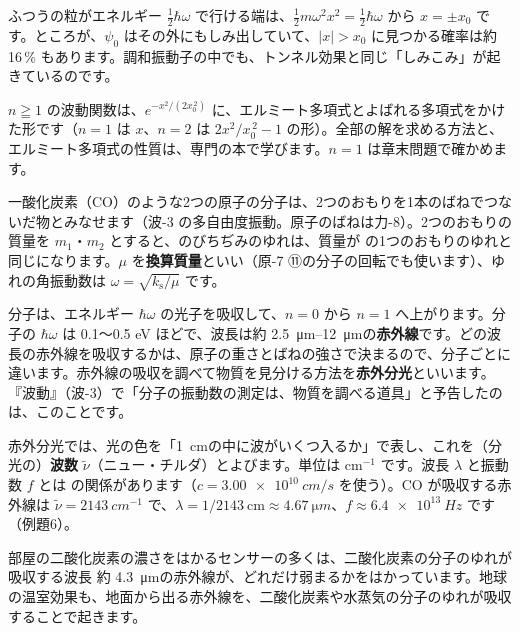\noindent ふつうの粒がエネルギー $\tfrac12\hbar\omega$ で行ける端は、$\tfrac12m\omega^2x^2=\tfrac12\hbar\omega$ から $x=\pm x_0$ です。ところが、$\psi_0$ はその外にもしみ出していて、$|x|>x_0$ に見つかる確率は約16\,\% もあります。調和振動子の中でも、トンネル効果と同じ「しみこみ」が起きているのです。

\begin{seikaku}
$n\geqq1$ の波動関数は、$e^{-x^2/(2x_0^{\,2})}$ に、エルミート多項式とよばれる多項式をかけた形です（$n=1$ は $x$、$n=2$ は $2x^2/x_0^{\,2}-1$ の形）。全部の解を求める方法と、エルミート多項式の性質は、専門の本で学びます。$n=1$ は章末問題で確かめます。
\end{seikaku}

\label{ph:原-6:sec9}
一酸化炭素（CO）のような2つの原子の分子は、2つのおもりを1本のばねでつないだ物とみなせます（波-3 の多自由度振動。原子のばねは力-8）。2つのおもりの質量を $m_1$・$m_2$ とすると、のびちぢみのゆれは、質量が
の1つのおもりのゆれと同じになります。$\mu$ を\textbf{換算質量}といい（原-7 ⑪の分子の回転でも使います）、ゆれの角振動数は $\omega=\sqrt{k_{\mathrm s}/\mu}$ です。

\noindent 分子は、エネルギー $\hbar\omega$ の光子を吸収して、$n=0$ から $n=1$ へ上がります。分子の $\hbar\omega$ は 0.1〜0.5 eV ほどで、波長は約 \qtyrange{2.5}{12}{\micro m}の\textbf{赤外線}です。どの波長の赤外線を吸収するかは、原子の重さとばねの強さで決まるので、分子ごとに違います。赤外線の吸収を調べて物質を見分ける方法を\textbf{赤外分光}といいます。『波動』（波-3）で「分子の振動数の測定は、物質を調べる道具」と予告したのは、このことです。

赤外分光では、光の色を「\qty{1}{cm}の中に波がいくつ入るか」で表し、これを（分光の）\textbf{波数} $\tilde\nu$（ニュー・チルダ）とよびます。単位は cm$^{-1}$ です。波長 $\lambda$ と振動数 $f$ とは
の関係があります（$c=\qty{3.00e10}{cm/s}$ を使う）。CO が吸収する赤外線は $\tilde\nu=\qty{2143}{cm^{-1}}$ で、$\lambda=1/2143\ \text{cm}\approx\qty{4.67}{\micro m}$、$f\approx\qty{6.4e13}{Hz}$ です（例題6）。

\begin{phmijika}
部屋の二酸化炭素の濃さをはかるセンサーの多くは、二酸化炭素の分子のゆれが吸収する波長 約 \qty{4.3}{\micro m}の赤外線が、どれだけ弱まるかをはかっています。地球の温室効果も、地面から出る赤外線を、二酸化炭素や水蒸気の分子のゆれが吸収することで起きます。
\end{phmijika}

